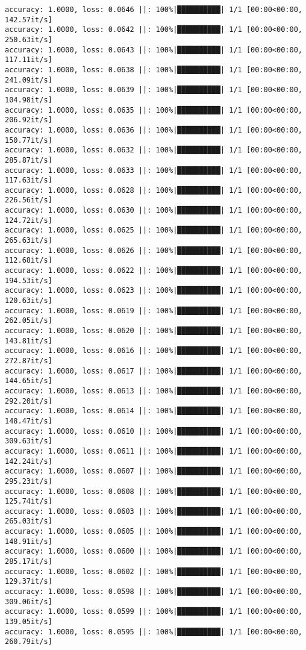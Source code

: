 \documentclass[
]{article}
\begin{document}
\begin{verbatim}
accuracy: 1.0000, loss: 0.0646 ||: 100%|██████████| 1/1 [00:00<00:00, 142.57it/s]
accuracy: 1.0000, loss: 0.0642 ||: 100%|██████████| 1/1 [00:00<00:00, 250.63it/s]
accuracy: 1.0000, loss: 0.0643 ||: 100%|██████████| 1/1 [00:00<00:00, 117.11it/s]
accuracy: 1.0000, loss: 0.0638 ||: 100%|██████████| 1/1 [00:00<00:00, 241.09it/s]
accuracy: 1.0000, loss: 0.0639 ||: 100%|██████████| 1/1 [00:00<00:00, 104.98it/s]
accuracy: 1.0000, loss: 0.0635 ||: 100%|██████████| 1/1 [00:00<00:00, 206.92it/s]
accuracy: 1.0000, loss: 0.0636 ||: 100%|██████████| 1/1 [00:00<00:00, 150.77it/s]
accuracy: 1.0000, loss: 0.0632 ||: 100%|██████████| 1/1 [00:00<00:00, 285.87it/s]
accuracy: 1.0000, loss: 0.0633 ||: 100%|██████████| 1/1 [00:00<00:00, 117.63it/s]
accuracy: 1.0000, loss: 0.0628 ||: 100%|██████████| 1/1 [00:00<00:00, 226.56it/s]
accuracy: 1.0000, loss: 0.0630 ||: 100%|██████████| 1/1 [00:00<00:00, 124.72it/s]
accuracy: 1.0000, loss: 0.0625 ||: 100%|██████████| 1/1 [00:00<00:00, 265.63it/s]
accuracy: 1.0000, loss: 0.0626 ||: 100%|██████████| 1/1 [00:00<00:00, 112.68it/s]
accuracy: 1.0000, loss: 0.0622 ||: 100%|██████████| 1/1 [00:00<00:00, 194.53it/s]
accuracy: 1.0000, loss: 0.0623 ||: 100%|██████████| 1/1 [00:00<00:00, 120.63it/s]
accuracy: 1.0000, loss: 0.0619 ||: 100%|██████████| 1/1 [00:00<00:00, 262.05it/s]
accuracy: 1.0000, loss: 0.0620 ||: 100%|██████████| 1/1 [00:00<00:00, 143.81it/s]
accuracy: 1.0000, loss: 0.0616 ||: 100%|██████████| 1/1 [00:00<00:00, 272.87it/s]
accuracy: 1.0000, loss: 0.0617 ||: 100%|██████████| 1/1 [00:00<00:00, 144.65it/s]
accuracy: 1.0000, loss: 0.0613 ||: 100%|██████████| 1/1 [00:00<00:00, 292.20it/s]
accuracy: 1.0000, loss: 0.0614 ||: 100%|██████████| 1/1 [00:00<00:00, 148.47it/s]
accuracy: 1.0000, loss: 0.0610 ||: 100%|██████████| 1/1 [00:00<00:00, 309.63it/s]
accuracy: 1.0000, loss: 0.0611 ||: 100%|██████████| 1/1 [00:00<00:00, 142.24it/s]
accuracy: 1.0000, loss: 0.0607 ||: 100%|██████████| 1/1 [00:00<00:00, 295.23it/s]
accuracy: 1.0000, loss: 0.0608 ||: 100%|██████████| 1/1 [00:00<00:00, 125.74it/s]
accuracy: 1.0000, loss: 0.0603 ||: 100%|██████████| 1/1 [00:00<00:00, 265.03it/s]
accuracy: 1.0000, loss: 0.0605 ||: 100%|██████████| 1/1 [00:00<00:00, 148.91it/s]
accuracy: 1.0000, loss: 0.0600 ||: 100%|██████████| 1/1 [00:00<00:00, 285.17it/s]
accuracy: 1.0000, loss: 0.0602 ||: 100%|██████████| 1/1 [00:00<00:00, 129.37it/s]
accuracy: 1.0000, loss: 0.0598 ||: 100%|██████████| 1/1 [00:00<00:00, 309.06it/s]
accuracy: 1.0000, loss: 0.0599 ||: 100%|██████████| 1/1 [00:00<00:00, 139.05it/s]
accuracy: 1.0000, loss: 0.0595 ||: 100%|██████████| 1/1 [00:00<00:00, 260.79it/s]

\end{verbatim}
\end{document}
